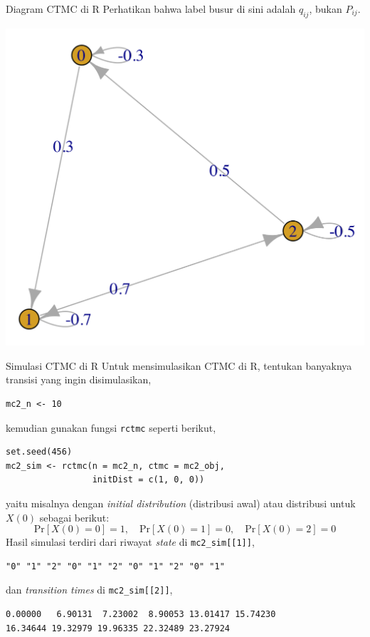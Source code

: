 \documentclass{beamer}
\newcommand{\brackets}[1]{\left[#1\right]}
\begin{document}
\begin{frame}{Diagram CTMC di R}
    Perhatikan bahwa label busur di sini adalah \(q_{ij}\), bukan \(P_{ij}\).

    \begin{center}
    \includegraphics[scale=0.8]{gambar/contoh_ctmc_plot.png}
    \end{center}
\end{frame}

\begin{frame}[fragile]{Simulasi CTMC di R}
    Untuk mensimulasikan CTMC di R, tentukan banyaknya transisi yang ingin disimulasikan,
\begin{verbatim}
mc2_n <- 10
\end{verbatim}
    kemudian gunakan fungsi \verb|rctmc| seperti berikut,
\begin{verbatim}
set.seed(456)
mc2_sim <- rctmc(n = mc2_n, ctmc = mc2_obj,
                 initDist = c(1, 0, 0))
\end{verbatim}
    yaitu misalnya dengan \textit{initial distribution} (distribusi awal) atau distribusi untuk \(X(0)\) sebagai berikut:
    \[\text{Pr}\brackets{X(0) = 0} = 1, \quad
    \text{Pr}\brackets{X(0) = 1} = 0, \quad
    \text{Pr}\brackets{X(0) = 2} = 0\]
    Hasil simulasi terdiri dari riwayat \textit{state} di \verb|mc2_sim[[1]]|,
\begin{verbatim}
"0" "1" "2" "0" "1" "2" "0" "1" "2" "0" "1"
\end{verbatim}
    dan \textit{transition times} di \verb|mc2_sim[[2]]|,
\begin{verbatim}
0.00000   6.90131  7.23002  8.90053 13.01417 15.74230
16.34644 19.32979 19.96335 22.32489 23.27924
\end{verbatim}
\end{frame}
\end{document}
